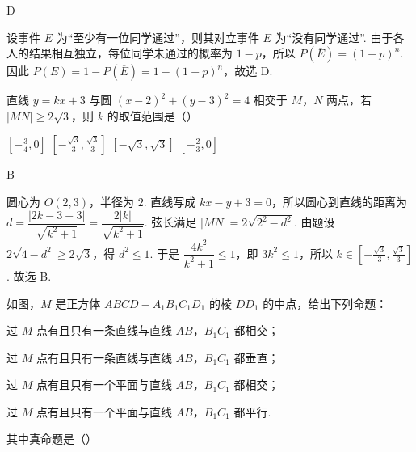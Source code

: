 \begin{answer}
D
\end{answer}

\begin{solution}
设事件 \(E\) 为“至少有一位同学通过”，则其对立事件 \(\overline E\) 为“没有同学通过”. 由于各人的结果相互独立，每位同学未通过的概率为 \(1-p\)，所以 \(P(\overline E)=(1-p)^{n}\). 因此 \(P(E)=1-P(\overline E)=1-(1-p)^{n}\)，故选 D.
\end{solution}

\begin{problem}
直线 \(y = kx + 3\) 与圆 \((x - 2)^2 + (y - 3)^2 = 4\) 相交于 \(M\)，\(N\) 两点，若 \(|MN| \geqslant 2\sqrt{3}\)，则 \(k\) 的取值范围是（\quad）

\choices
    {\(\left[-\frac{3}{4}, 0\right]\)}
    {\(\left[-\frac{\sqrt{3}}{3}, \frac{\sqrt{3}}{3}\right]\)}
    {\(\left[-\sqrt{3}, \sqrt{3}\right]\)}
    {\(\left[-\frac{2}{3}, 0\right]\)}
\end{problem}

\begin{answer}
B
\end{answer}

\begin{solution}
圆心为 \(O(2,3)\)，半径为 \(2\). 直线写成 \(kx-y+3=0\)，所以圆心到直线的距离为 \(d=\dfrac{|2k-3+3|}{\sqrt{k^{2}+1}}=\dfrac{2|k|}{\sqrt{k^{2}+1}}\). 弦长满足 \(\lvert MN\rvert=2\sqrt{2^{2}-d^{2}}\). 由题设 \(2\sqrt{4-d^{2}}\geqslant2\sqrt3\)，得 \(d^{2}\leqslant1\). 于是 \(\dfrac{4k^{2}}{k^{2}+1}\leqslant1\)，即 \(3k^{2}\leqslant1\)，所以 \(k\in\left[-\frac{\sqrt3}{3},\frac{\sqrt3}{3}\right]\). 故选 B.
\end{solution}

\begin{problem}
如图，\(M\) 是正方体 \(ABCD-A_{1}B_{1}C_{1}D_{1}\) 的棱 \(DD_{1}\) 的中点，给出下列命题：


\begin{circlelist}
\item 过 \(M\) 点有且只有一条直线与直线 \(AB\)，\(B_{1}C_{1}\) 都相交；
\item 过 \(M\) 点有且只有一条直线与直线 \(AB\)，\(B_{1}C_{1}\) 都垂直；
\item 过 \(M\) 点有且只有一个平面与直线 \(AB\)，\(B_{1}C_{1}\) 都相交；
\item 过 \(M\) 点有且只有一个平面与直线 \(AB\)，\(B_{1}C_{1}\) 都平行.
\end{circlelist}
其中真命题是（\quad）

\choices
    {}
    {}
    {}
    {}
\end{problem}

